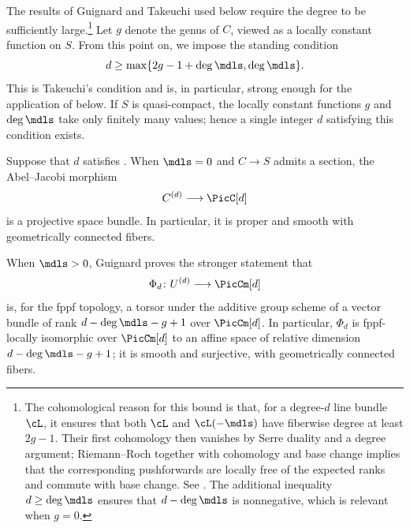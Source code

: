 The results of Guignard and Takeuchi used below require the degree to be
sufficiently large.\footnote{The cohomological reason for this bound is that,
for a degree-$d$ line bundle $\cL$, it ensures that both $\cL$ and
$\cL(-\mdls)$ have fiberwise degree at least $2g-1$. Their first cohomology
then vanishes by Serre duality and a degree argument; Riemann--Roch together
with cohomology and base change implies that the corresponding pushforwards
are locally free of the expected ranks and commute with base change. See
\cite[Proposition~4.3]{Guignard2018}. The additional inequality
$d\geq\deg\mdls$ ensures that $d-\deg\mdls$ is nonnegative, which is relevant
when $g=0$.} Let $g$ denote the genus of $C$, viewed as a locally
constant function on $S$. From this point on, we impose the standing
condition
\begin{equation} \label{equation:degree-condition}
    d \geq \max\{2g - 1 + \deg \mdls, \deg \mdls\}.
\end{equation}
This is Takeuchi's condition \cite[\S3, (3.1)]{takeuchi2018blow} and is, in
particular, strong enough for the application of
\cite[Proposition~4.14]{Guignard2018} below. If $S$ is quasi-compact, the
locally constant functions $g$ and $\deg\mdls$ take only finitely many
values; hence a single integer $d$ satisfying this condition exists.

Suppose that $d$ satisfies . When $\mdls=0$
and $C\to S$ admits a section, the Abel--Jacobi morphism
\[
    C^{(d)}\longrightarrow\PicC[d]
\]
is a projective space bundle. In particular, it is proper and smooth with
geometrically connected fibers.

When $\mdls>0$, Guignard \cite[Proposition~4.14]{Guignard2018} proves the
stronger statement that
\[
    \Phi_d\colon U^{(d)}\longrightarrow\PicCm[d]
\]
is, for the fppf topology, a torsor under the additive group scheme of a
vector bundle of rank $d-\deg\mdls-g+1$ over $\PicCm[d]$. In particular,
$\Phi_d$ is fppf-locally isomorphic over $\PicCm[d]$ to an affine space of
relative dimension $d-\deg\mdls-g+1$; it is smooth and surjective, with
geometrically connected fibers.

